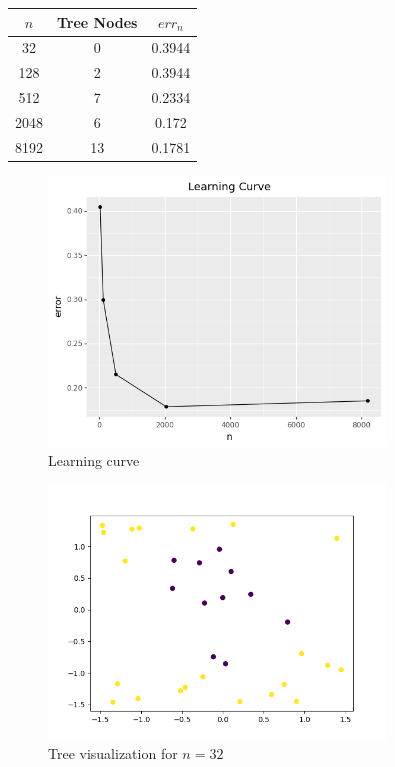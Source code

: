\documentclass[a4paper]{article}
\theoremstyle{definition}
\newenvironment{soln}{
    \leavevmode\color{blue}\ignorespaces
}{}
\begin{document}
\begin{soln}
  \begin{center}
    \begin{tabular}{|c|c|c|}
      \hline
      $n$ & Tree Nodes & $err_n$ \\
      \hline
      32  &  0  &  0.3944  \\
      128  &  2  &  0.3944  \\
      512  &  7  &  0.2334  \\
      2048  &  6  &  0.172  \\
      8192  &  13  &  0.1781  \\
      \hline
    \end{tabular}
    \end{center}

    \begin{figure}[H]
      \centering
      \includegraphics[width=0.8\textwidth]{../plots/error_curve.png}
      \caption{Learning curve}
      \label{fig:error_curve} 
    \end{figure}

    \begin{figure}[H]
      \centering
      \includegraphics[width=0.8\textwidth]{../plots/dbig_32.png}
      \caption{Tree visualization for $n = 32$}
      \label{fig:dbig_32}
    \end{figure}
    

\end{soln}
\end{document}
